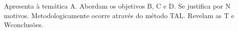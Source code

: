 Apresenta à temática A. Abordam os objetivos B, C e D. Se justifica por N motivos. Metodologicamente ocorre através do método TAL. Revelam as T e Wconclusões.

